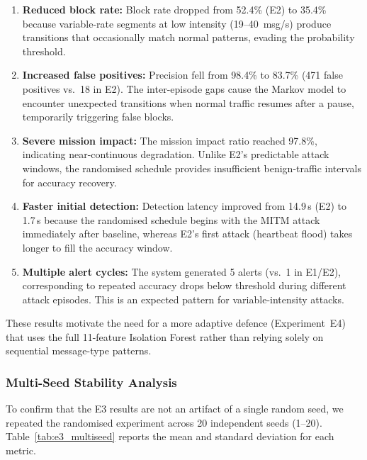 \begin{enumerate}
    \item \textbf{Reduced block rate:} Block rate dropped from 52.4\% (E2) to 35.4\% because variable-rate segments at low intensity (19--40~msg/s) produce transitions that occasionally match normal patterns, evading the probability threshold.

    \item \textbf{Increased false positives:} Precision fell from 98.4\% to 83.7\% (471 false positives vs.\ 18 in E2).
    The inter-episode gaps cause the Markov model to encounter unexpected transitions when normal traffic resumes after a pause, temporarily triggering false blocks.

    \item \textbf{Severe mission impact:} The mission impact ratio reached 97.8\%, indicating near-continuous degradation.
    Unlike E2's predictable attack windows, the randomised schedule provides insufficient benign-traffic intervals for accuracy recovery.

    \item \textbf{Faster initial detection:} Detection latency improved from 14.9\,s (E2) to 1.7\,s because the randomised schedule begins with the MITM attack immediately after baseline, whereas E2's first attack (heartbeat flood) takes longer to fill the accuracy window.

    \item \textbf{Multiple alert cycles:} The system generated 5 alerts (vs.\ 1 in E1/E2), corresponding to repeated accuracy drops below threshold during different attack episodes. This is an expected pattern for variable-intensity attacks.
\end{enumerate}

These results motivate the need for a more adaptive defence (Experiment~E4) that uses the full 11-feature Isolation Forest rather than relying solely on sequential message-type patterns.

\subsubsection{Multi-Seed Stability Analysis}

To confirm that the E3 results are not an artifact of a single random seed, we repeated the randomised experiment across 20 independent seeds (1--20).
Table~\ref{tab:e3_multiseed} reports the mean and standard deviation for each metric.

